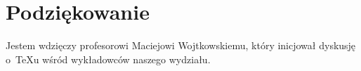 \chapter*{Podziękowanie}

Jestem wdzięczy profesorowi Maciejowi Wojtkowskiemu, który inicjował dyskusję o~\TeX u wśród wykładowców naszego wydziału.